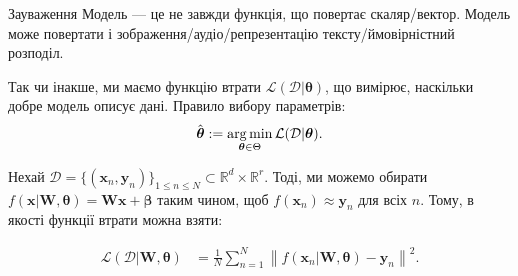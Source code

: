 \documentclass{zkdl-presentation-template}
\begin{document}
    \begin{frame}
        \begin{block}{Зауваження}
            Модель --- це не завжди функція, що повертає скаляр/вектор. Модель може повертати і зображення/аудіо/репрезентацію тексту/ймовірністний розподіл.
        \end{block}

        Так чи інакше, ми маємо функцію втрати $\mathcal{L}(\mathcal{D}|\boldsymbol{\theta})$, що вимірює, наскільки добре модель описує дані. Правило вибору параметрів:
        \begin{equation*}
            \hat{\boldsymbol{\theta}} := \operatorname*{arg\,min}_{\boldsymbol{\theta} \in \Theta} \mathcal{L}(\mathcal{D}|\boldsymbol{\theta}).
        \end{equation*}
        \vspace{-15px}
        \begin{example}
            Нехай $\mathcal{D} = \{(\boldsymbol{x}_n,\boldsymbol{y}_n)\}_{1 \leq
            n \leq N} \subset \mathbb{R}^d \times \mathbb{R}^r$. Тоді, ми можемо
            обирати
            $f(\boldsymbol{x}|\boldsymbol{W},\boldsymbol{\theta})=\boldsymbol{W}\boldsymbol{x}+\boldsymbol{\beta}$ таким чином,
            щоб $f(\boldsymbol{x}_n) \approx \boldsymbol{y}_n$ для всіх $n$. Тому, в якості функції втрати можна взяти:
            
            \vspace{-20px}
            \begin{align*}
                \mathcal{L}(\mathcal{D}|\boldsymbol{W},\boldsymbol{\theta}) &= \frac{1}{N}\sum_{n=1}^N\left\|f(\boldsymbol{x}_n|\boldsymbol{W},\boldsymbol{\theta}) - \boldsymbol{y}_n \right\|^2.
            \end{align*}
        \end{example}
    \end{frame}
\end{document}
